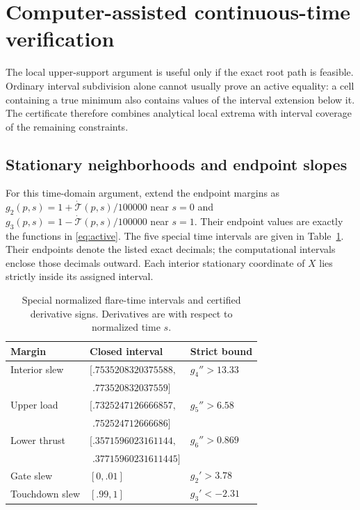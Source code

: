 \section{Computer-assisted continuous-time verification}\label{sec:continuous}
The local upper-support argument is useful only if the exact root path is feasible. Ordinary interval subdivision alone cannot usually prove an active equality: a cell containing a true minimum also contains values of the interval extension below it. The certificate therefore combines analytical local extrema with interval coverage of the remaining constraints.

\subsection{Stationary neighborhoods and endpoint slopes}
For this time-domain argument, extend the endpoint margins as $g_2(p,s)=1+\dot{\mathcal T}(p,s)/100000$ near $s=0$ and $g_3(p,s)=1-\dot{\mathcal T}(p,s)/100000$ near $s=1$. Their endpoint values are exactly the functions in \eqref{eq:active}. The five special time intervals are given in Table~\ref{tab:events}. Their endpoints denote the listed exact decimals; the computational intervals enclose those decimals outward. Each interior stationary coordinate of $X$ lies strictly inside its assigned interval.
\begin{table}[htbp]\centering\caption{Special normalized flare-time intervals and certified derivative signs. Derivatives are with respect to normalized time $s$.}\label{tab:events}
\begin{tabular}{lll}\toprule
Margin & Closed interval & Strict bound\\\midrule
Interior slew & $[.7535208320375588,$ & $g_4''>13.33$\\
 & $\phantom{[}.773520832037559]$ &\\
Upper load & $[.7325247126666857,$ & $g_5''>6.58$\\
 & $\phantom{[}.752524712666686]$ &\\
Lower thrust & $[.3571596023161144,$ & $g_6''>0.869$\\
 & $\phantom{[}.37715960231611445]$ &\\
Gate slew & $[0,.01]$ & $g_2'>3.78$\\
Touchdown slew & $[.99,1]$ & $g_3'<-2.31$\\\bottomrule
\end{tabular}\end{table}

